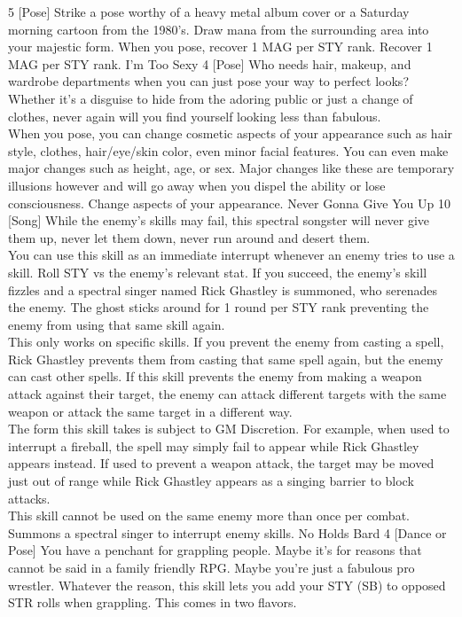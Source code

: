 \begin{path}
{5}
[Pose]
{Strike a pose worthy of a heavy metal album cover or a Saturday morning cartoon from the 1980’s. Draw mana from the surrounding area into your majestic form. When you pose, recover 1 MAG per STY rank.}
{Recover 1 MAG per STY rank.}
\skilldescription
{I'm Too Sexy}
{4}
[Pose]
{Who needs hair, makeup, and wardrobe departments when you can just pose your way to perfect looks? Whether it's a disguise to hide from the adoring public or just a change of clothes, never again will you find yourself looking less than fabulous.
\\When you pose, you can change cosmetic aspects of your appearance such as hair style, clothes, hair/eye/skin color, even minor facial features. You can even make major changes such as height, age, or sex. Major changes like these are temporary illusions however and will go away when you dispel the ability or lose consciousness.}
{Change aspects of your appearance.}
\skilldescription
{Never Gonna Give You Up}
{10}
[Song]
{While the enemy's skills may fail, this spectral songster will never give them up, never let them down, never run around and desert them.\\
You can use this skill as an immediate interrupt whenever an enemy tries to use a skill. Roll STY vs the enemy's relevant stat. If you succeed, the enemy's skill fizzles and a spectral singer named Rick Ghastley is summoned, who serenades the enemy. The ghost sticks around for 1 round per STY rank preventing the enemy from using that same skill again.\\
This only works on specific skills. If you prevent the enemy from casting a spell, Rick Ghastley prevents them from casting that same spell again, but the enemy can cast other spells. If this skill prevents the enemy from making a weapon attack against their target, the enemy can attack different targets with the same weapon or attack the same target in a different way.\\
The form this skill takes is subject to GM Discretion. For example, when used to interrupt a fireball, the spell may simply fail to appear while Rick Ghastley appears instead. If used to prevent a weapon attack, the target may be moved just out of range while Rick Ghastley appears as a singing barrier to block attacks.\\
This skill cannot be used on the same enemy more than once per combat.
}
{Summons a spectral singer to interrupt enemy skills.}
\skilldescription
{No Holds Bard}
{4}
[Dance or Pose]
{You have a penchant for grappling people. Maybe it's for reasons that cannot be said in a family friendly RPG. Maybe you're just a fabulous pro wrestler. Whatever the reason, this skill lets you add your STY (SB) to opposed STR rolls when grappling. This comes in two flavors.
}
\end{path}
